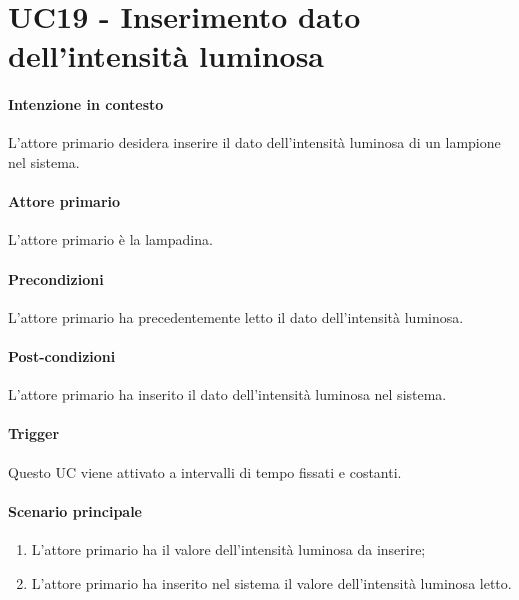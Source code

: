 \section{UC19 - Inserimento dato dell'intensità luminosa}\label{uc:19}
\paragraph{Intenzione in contesto} L'attore primario desidera inserire il dato dell'intensità luminosa di un lampione nel sistema.
\paragraph{Attore primario} L'attore primario è la lampadina.
\paragraph{Precondizioni} L'attore primario ha precedentemente letto il dato dell'intensità luminosa.
\paragraph{Post-condizioni} L'attore primario ha inserito il dato dell'intensità luminosa nel sistema.
\paragraph{Trigger} Questo UC viene attivato a intervalli di tempo fissati e costanti.
\paragraph{Scenario principale}
\begin{enumerate}
    \item L'attore primario ha il valore dell'intensità luminosa da inserire;
    \item L'attore primario ha inserito nel sistema il valore dell'intensità luminosa letto.
\end{enumerate}